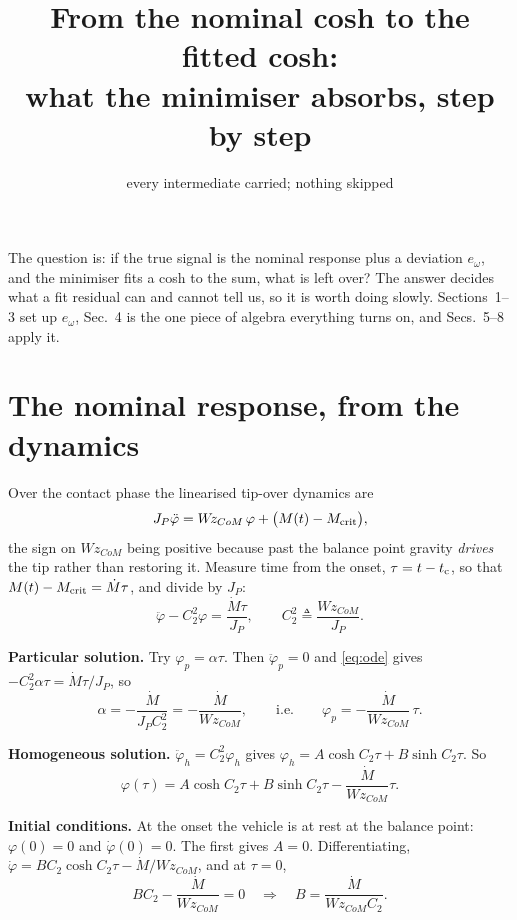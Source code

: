 \documentclass[11pt]{article}
\title{\vspace{-18mm}\textbf{From the nominal cosh to the fitted cosh:\\
what the minimiser absorbs, step by step}\vspace{-3mm}}
\date{\small every intermediate carried; nothing skipped}
\newcommand{\Wz}{W\!z_{CoM}}
\newcommand{\tc}{t_{\rm c}}
\begin{document}
\maketitle

The question is: if the true signal is the nominal response plus a
deviation $e_\omega$, and the minimiser fits a cosh to the sum, what is
left over? The answer decides what a fit residual can and cannot tell
us, so it is worth doing slowly. Sections~1--3 set up $e_\omega$,
Sec.~4 is the one piece of algebra everything turns on, and
Secs.~5--8 apply it.

\section{The nominal response, from the dynamics}

Over the contact phase the linearised tip-over dynamics are
\begin{equation}
  J_P\ddot\varphi = \Wz\,\varphi + \bigl(M(t) - M_{\rm crit}\bigr),
  \label{eq:dyn}
\end{equation}
the sign on $\Wz$ being positive because past the balance point gravity
\emph{drives} the tip rather than restoring it. Measure time from the
onset, $\tau = t - \tc$, so that $M(t) - M_{\rm crit} = \dot M\tau$, and
divide by $J_P$:
\begin{equation}
  \ddot\varphi - C_2^{2}\varphi = \frac{\dot M\tau}{J_P},
  \qquad C_2^{2} \triangleq \frac{\Wz}{J_P}.
  \label{eq:ode}
\end{equation}

\textbf{Particular solution.} Try $\varphi_p = \alpha\tau$. Then
$\ddot\varphi_p = 0$ and \eqref{eq:ode} gives
$-C_2^2\alpha\tau = \dot M\tau/J_P$, so
\[
  \alpha = -\frac{\dot M}{J_PC_2^{2}} = -\frac{\dot M}{\Wz},
  \qquad\text{i.e.}\qquad
  \varphi_p = -\frac{\dot M}{\Wz}\,\tau .
\]

\textbf{Homogeneous solution.} $\ddot\varphi_h = C_2^2\varphi_h$ gives
$\varphi_h = A\cosh C_2\tau + B\sinh C_2\tau$. So
\begin{equation}
  \varphi(\tau) = A\cosh C_2\tau + B\sinh C_2\tau
                  - \frac{\dot M}{\Wz}\tau .
\end{equation}

\textbf{Initial conditions.} At the onset the vehicle is at rest at the
balance point: $\varphi(0) = 0$ and $\dot\varphi(0) = 0$. The first
gives $A = 0$. Differentiating,
$\dot\varphi = BC_2\cosh C_2\tau - \dot M/\Wz$, and at $\tau = 0$,
\[
  BC_2 - \frac{\dot M}{\Wz} = 0
  \quad\Longrightarrow\quad
  B = \frac{\dot M}{\Wz C_2}.
\]
\end{document}
